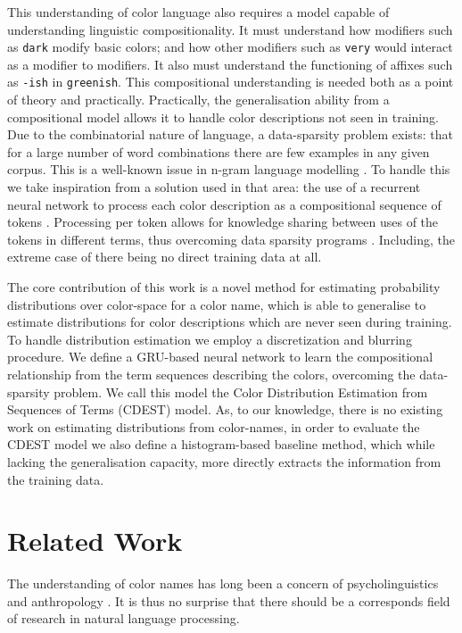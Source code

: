 \documentclass[11pt,a4paper]{article}
\newcommand{\parencite}{\citep}
\begin{document}
This understanding of color language also requires a model capable of understanding linguistic compositionality.
It must understand how modifiers such as \texttt{dark} modify basic colors; and  how other modifiers such as \texttt{very} would interact as a modifier to modifiers.
It also must understand the functioning of affixes such as \texttt{-ish} in \texttt{greenish}.
This compositional understanding is needed both as a point of theory and practically.
Practically, the generalisation ability from a compositional model allows it to handle color descriptions not seen in training.
Due to the combinatorial nature of language, a data-sparsity problem exists: that
for a large number of word combinations there are few examples in any given corpus.
This is a well-known issue in n-gram language modelling \parencite{kneser1995improved,chen1996empirical,rosenfeld2000two}.
To handle this we take inspiration from a solution used in that area: the use of a recurrent neural network to process each color description as a compositional sequence of tokens \parencite{mikolov2011RnnLM}.
Processing per token allows for knowledge sharing between uses of the tokens in different terms, thus overcoming data sparsity programs \parencite{NPLM}.
Including, the extreme case of there being no direct training data at all.


The core contribution of this work is a novel method for estimating probability distributions over color-space for a color name,
 which is able to generalise to estimate distributions for color descriptions which are never seen during training.
To handle distribution estimation we employ a discretization and blurring procedure.
We define a GRU-based neural network to learn the compositional relationship from the term sequences describing the colors, overcoming the data-sparsity problem.
We call this model the Color Distribution Estimation from Sequences of Terms (CDEST) model.
As, to our knowledge, there is no existing work on estimating distributions from color-names, in order to evaluate the CDEST model we also define a histogram-based baseline method, which while lacking the generalisation capacity, more directly extracts the information from the training data.


\section{Related Work}\label{sec:related-work}
The understanding of color names has long been a concern of psycholinguistics and anthropology  \parencite{berlin1969basic,heider1972universals,HEIDER1972337,mylonas2015use}.
It is thus no surprise that there should be a corresponds field of research in natural language processing.
\end{document}
